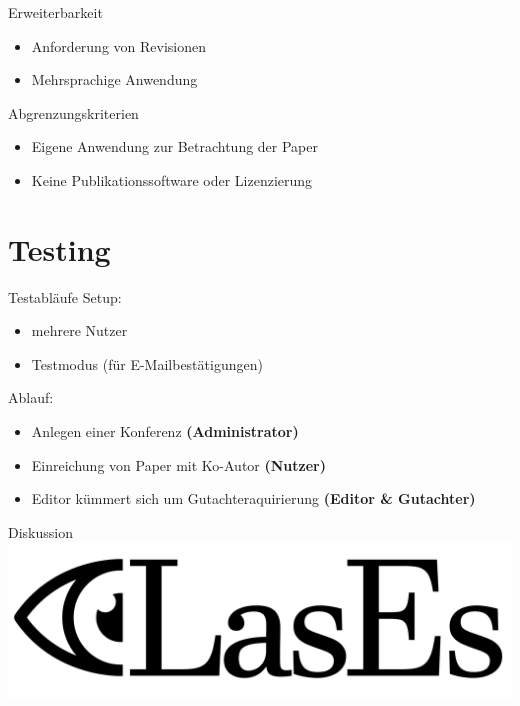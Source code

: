 \documentclass{beamer}
\begin{document}
\begin{frame}{Erweiterbarkeit}
	\pause
	\begin{itemize}
		\item Anforderung von Revisionen
		\pause
		\item Mehrsprachige Anwendung
	\end{itemize}
\end{frame}

\begin{frame}{Abgrenzungskriterien}
	\pause
	\begin{itemize}
		\item Eigene Anwendung zur Betrachtung der Paper
		\pause
		\item Keine Publikationssoftware oder Lizenzierung
	\end{itemize}
\end{frame}

\section{Testing}
\begin{frame}{Testabläufe}
	\pause
	Setup:
	\begin{itemize}
		\item mehrere Nutzer
		\item Testmodus (für E-Mailbestätigungen)
	\end{itemize}

	\pause

	Ablauf:
	\begin{itemize}
		\item Anlegen einer Konferenz \textbf{(Administrator)}
		\item Einreichung von Paper mit Ko-Autor \textbf{(Nutzer)}
		\item Editor kümmert sich um Gutachteraquirierung \textbf{(Editor \& Gutachter)}
	\end{itemize}
\end{frame}

\begin{frame}{Diskussion}
	\centering
	\includegraphics[width=0.7\linewidth]{../../docs/Pflichtenheft/graphics/LasEs-logo}
\end{frame}
\end{document}
